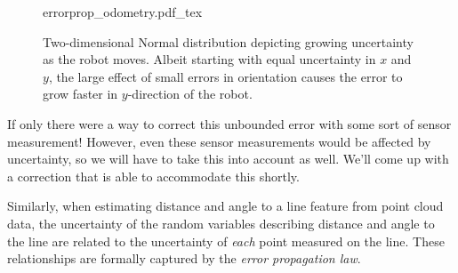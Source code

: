 \begin{figure}
	\centering
    \def\svgwidth{\textwidth}
    {errorprop_odometry.pdf_tex}
	\caption{Two-dimensional Normal distribution depicting growing uncertainty as the robot moves. Albeit starting with equal
    uncertainty in $x$ and $y$, the large effect of small errors in orientation causes the error to grow faster in $y$-direction of the robot.}
	\label{fig:errorprop_odometry}
\end{figure}

If only there were a way to correct this unbounded error with some sort of sensor measurement! However, even these sensor measurements would be affected by uncertainty, so we will have to take this into account as well. We'll come up with a correction that is able to accommodate this shortly.

Similarly, when estimating distance and angle to a line feature from point cloud data, the uncertainty of the random variables describing distance and angle to the line are related to the uncertainty of \textsl{each} point measured on the line. These relationships are formally captured by the \textsl{error propagation law}.

